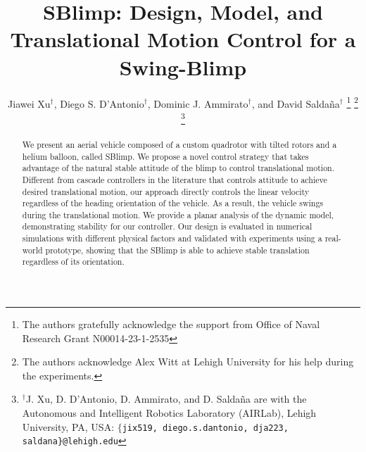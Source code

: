 \documentclass[conference]{ieeeconf}
\begin{document}
\title{\bf 
SBlimp: Design, Model, and Translational Motion Control for a Swing-Blimp
}
\author{Jiawei Xu${}^{\dag}$, Diego S. D'Antonio${}^{\dag}$, Dominic J. Ammirato${}^{\dag}$, and David Salda\~{n}a${}^{\dag}$
\thanks{The authors gratefully acknowledge the support from Office of Naval Research Grant  N00014-23-1-2535}
\thanks{The authors acknowledge Alex Witt at Lehigh University for his help during the experiments.}
\thanks{${}^{\dag}$J. Xu, D. D'Antonio, D. Ammirato, and D. Salda\~{n}a are with the Autonomous and Intelligent Robotics Laboratory (AIRLab), Lehigh University, PA, USA: $\{$\texttt{jix519, diego.s.dantonio, dja223, saldana\}@lehigh.edu}
}}

\maketitle

\begin{abstract}
We present an aerial vehicle composed of a custom quadrotor with tilted rotors and a helium balloon, called SBlimp. 
We propose a novel control strategy that takes advantage of the natural stable attitude of the blimp to control translational motion.
Different from cascade controllers in the literature that controls attitude to achieve desired translational motion, our approach directly controls the linear velocity regardless of the heading orientation of the vehicle. As a result, the vehicle swings during the translational motion. We provide a planar analysis of the dynamic model, demonstrating stability for our controller. 
Our design is evaluated in numerical simulations with different physical factors and validated with experiments using a real-world prototype, showing that the SBlimp is able to achieve stable translation regardless of its orientation. 


\end{abstract}
\end{document}
